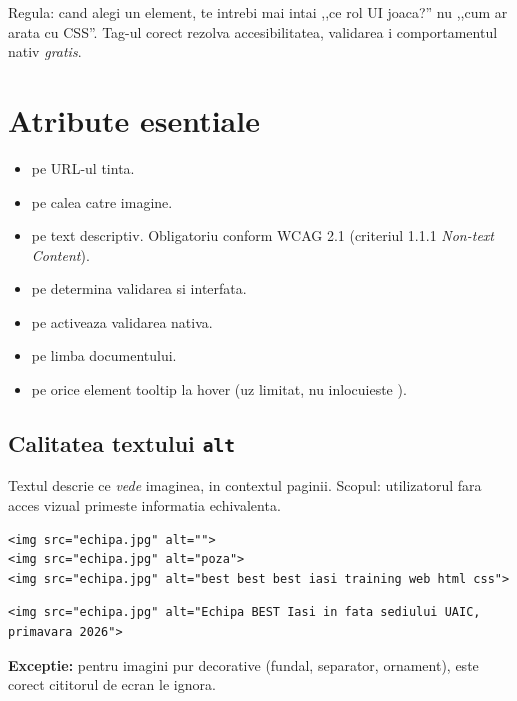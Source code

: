 Regula: cand alegi un element, te intrebi mai intai ,,ce rol UI joaca?'' \textendash{} nu ,,cum ar arata cu CSS''. Tag-ul corect rezolva accesibilitatea, validarea i comportamentul nativ \emph{gratis}.

\section{Atribute esentiale}

\begin{itemize}
  \item {} pe  \textendash{} URL-ul tinta.
  \item {} pe  \textendash{} calea catre imagine.
  \item {} pe  \textendash{} text descriptiv. Obligatoriu conform WCAG 2.1 (criteriul 1.1.1 \emph{Non-text Content}).
  \item {} pe  \textendash{} determina validarea si interfata.
  \item {} pe  \textendash{} activeaza validarea nativa.
  \item {} pe  \textendash{} limba documentului.
  \item {} pe orice element \textendash{} tooltip la hover (uz limitat, nu inlocuieste ).
\end{itemize}

\subsection{Calitatea textului \texttt{alt}}

Textul  descrie ce \emph{vede} imaginea, in contextul paginii. Scopul: utilizatorul fara acces vizual primeste informatia echivalenta.

\begin{dano}
\begin{lstlisting}[style=html, numbers=none]
<img src="echipa.jpg" alt="">
<img src="echipa.jpg" alt="poza">
<img src="echipa.jpg" alt="best best best iasi training web html css">
\end{lstlisting}
\end{dano}

\begin{dado}
\begin{lstlisting}[style=html, numbers=none]
<img src="echipa.jpg" alt="Echipa BEST Iasi in fata sediului UAIC, primavara 2026">
\end{lstlisting}
\textbf{Exceptie:} pentru imagini pur decorative (fundal, separator, ornament),  este corect \textendash{} cititorul de ecran le ignora.
\end{dado}

